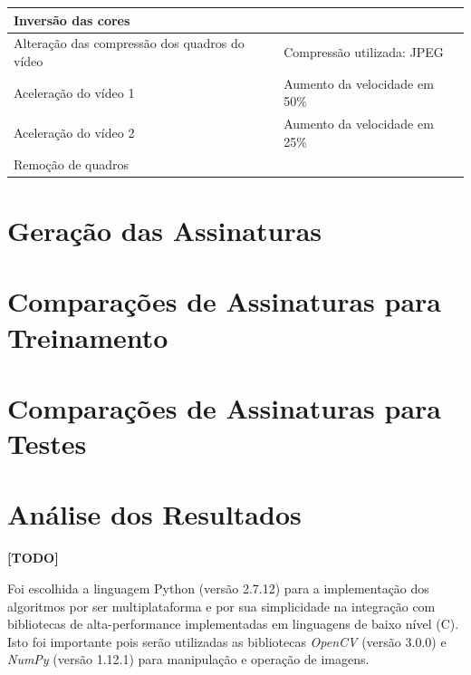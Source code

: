 \begin{table}[h]
\begin{tabular}{ll}
\multicolumn{1}{|l|}{Inversão das cores}                                          & \multicolumn{1}{l|}{}                                                                                                    \\ \hline
\multicolumn{1}{|l|}{Alteração das compressão dos quadros do vídeo}               & \multicolumn{1}{l|}{Compressão utilizada: JPEG}                                                                          \\ \hline
\multicolumn{1}{|l|}{Aceleração do vídeo 1}                                       & \multicolumn{1}{l|}{Aumento da velocidade em 50\%}                                                                       \\ \hline
\multicolumn{1}{|l|}{Aceleração do vídeo 2}                                       & \multicolumn{1}{l|}{Aumento da velocidade em 25\%}                                                                       \\ \hline
Remoção de quadros                                                                &                                                                                                                          \\ \hline
\end{tabular}
\end{table}

\section{Geração das Assinaturas}
\label{sec:met-assinaturas}

\section{Comparações de Assinaturas para Treinamento}
\label{sec:met-comparacao-treinamento}

\section{Comparações de Assinaturas para Testes}
\label{sec:met-comparacao-testes}


\section{Análise dos Resultados}
\label{sec:met-analise}


\textbf{[TODO]}


Foi escolhida a linguagem Python (versão 2.7.12) para a implementação dos algoritmos por ser multiplataforma e  por sua simplicidade na integração com bibliotecas de alta-performance implementadas em linguagens de baixo nível (C). Isto foi importante pois serão utilizadas as bibliotecas \textit{OpenCV} (versão 3.0.0) e \textit{NumPy} (versão 1.12.1) para manipulação e operação de imagens.

